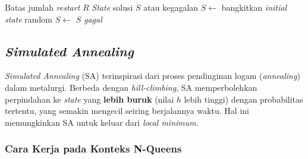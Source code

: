 \documentclass[12pt,a4paper]{article}
\begin{document}
\begin{algorithm}[H]
\caption{\textit{Random Restart Hill-Climbing} untuk N-Queens}
\label{alg:random-restart-hc}
\begin{algorithmic}[1]
\Require Batas jumlah \textit{restart} $R$
\Ensure \textit{State} solusi $S$ atau kegagalan
    \State $S \leftarrow$ bangkitkan \textit{initial state} random
    \State $S \leftarrow$  
        \State \Return $S$ 
    \EndIf
\EndFor
\State \Return \textit{gagal}
\end{algorithmic}
\end{algorithm}

\subsection{\textit{Simulated Annealing}}
\label{subsec:simulated-annealing}

\textit{Simulated Annealing} (SA) terinspirasi dari proses pendinginan logam (\textit{annealing}) dalam metalurgi. Berbeda dengan \textit{hill-climbing}, SA memperbolehkan perpindahan ke \textit{state} yang \textbf{lebih buruk} (nilai $h$ lebih tinggi) dengan probabilitas tertentu, yang semakin mengecil seiring berjalannya waktu. Hal ini memungkinkan SA untuk keluar dari \textit{local minimum}.

\subsubsection{Cara Kerja pada Konteks N-Queens}
\label{subsubsec:sa-cara-kerja}
\end{document}

